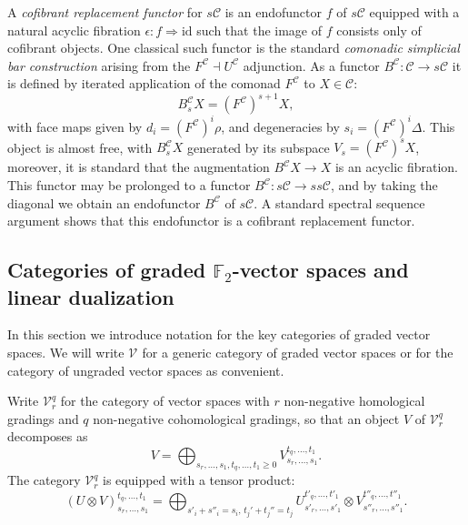 \documentclass[11pt]{amsart} \renewcommand{\baselinestretch}{1.2}
\theoremstyle{plain}
\numberwithin{equation}{section} %
\theoremstyle{plain}
\numberwithin{equation}{chapter} %
\renewcommand{\to}{\longrightarrow}
\newcommand{\calV}{\mathcal{V}}
\newcommand{\calc}{\mathcal{C}}
\newcommand{\citeBOX}[2][]{\cite[\mbox{#1}]{#2}}
\newcommand{\vect}[2]{\calV^{#1}_{#2}}
\newcommand{\F}{\mathbb{F}}
\newcommand{\Id}{\mathrm{id}}
\newcommand{\Ftwo}{\F_2}
\newcommand{\SubsectionOrSection}[1]{\subsection{#1}}
\begin{document}
\begin{Conventions and notation}
A \emph{cofibrant replacement functor} for $s\calc$  is an endofunctor $f$ of $s\calc$ equipped with  a natural acyclic fibration $\epsilon:f\Rightarrow \Id $ such that the image of $f$ consists only of cofibrant objects. One classical such functor is the standard \emph{comonadic simplicial bar construction}  arising from the $F^\calc\dashv U^\calc$ adjunction.
As a functor $B^\calc :\calc\to s\calc$ it is defined by iterated application of the comonad $F^\calc$ to $X\in \calc$:
\[B_s^\calc X=(F^\calc)^{s+1}X,\]
with face maps given by $d_i=(F^\calc)^i\rho$, and degeneracies by $s_i=(F^\calc)^i\Delta$. %
This object is almost free, with $B_s^\calc X$ generated by its subspace $V_s=(F^\calc )^sX$, moreover, it is standard \citeBOX[\S4]{BlumRiehlResolutions.pdf} that the augmentation $B^\calc X\to X$ is an acyclic fibration. This functor may be prolonged to a functor $B^\calc :s\calc\to ss\calc$, and by taking the diagonal we obtain an endofunctor $B^{\calc}$ of $s\calc$. A standard spectral sequence argument shows that this endofunctor is a cofibrant replacement functor.




\SubsectionOrSection{Categories of graded $\Ftwo $-vector spaces and linear dualization}
In this section we introduce  notation for the key categories of graded vector spaces. We will write $\vect{}{}$ for a generic category of graded vector spaces or for the category of ungraded vector spaces as convenient.

Write $\vect{q}{r}$ for the category of vector spaces with $r$ non-negative homological gradings and $q$ non-negative cohomological gradings, so that an object $V$ of $\vect{q}{r}$ decomposes as
\[V=\bigoplus_{s_r,\ldots,s_1,t_q,\ldots,t_1\geq0}V^{t_q,\ldots,t_1}_{s_r,\ldots,s_1}.\]
The category $\vect{q}{r}$ is equipped with a tensor product:
\[(U\otimes V)^{t_q,\ldots,t_1}_{s_r,\ldots,s_1}=\bigoplus_{s'_i+s''_i=s_i,\,t_j'+t_j''=t_j}U^{t'_q,\ldots,t'_1}_{s'_r,\ldots,s'_1}\otimes V^{t''_q,\ldots,t''_1}_{s''_r,\ldots,s''_1}.\]


\end{Conventions and notation}
\end{document}
